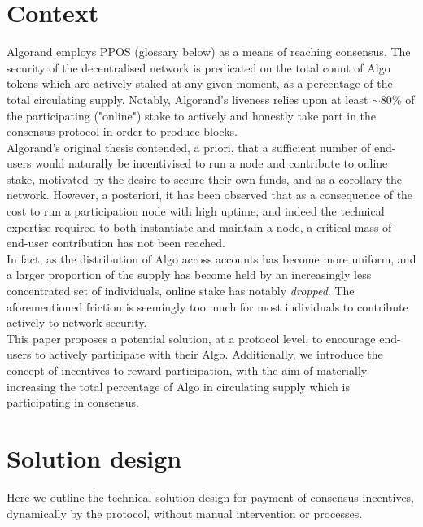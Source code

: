 \documentclass[11pt,a4paper]{article}
\begin{document}
\pagebreak

\section{Context}
Algorand employs \gls{PPOS} (glossary below) as a means of reaching consensus. The security of the decentralised network 
is predicated on the total count of Algo tokens which are actively staked at any given moment, as a percentage of the 
total circulating supply. Notably, Algorand's liveness relies upon at least $\sim$80\% of the participating ("online") 
stake to actively and honestly take part in the consensus protocol in order to produce blocks. \\ 

Algorand's original thesis contended, a priori, that a sufficient number of end-users would naturally be incentivised to 
run a node and contribute to online stake, motivated by the desire to secure their own funds, and as a corollary the 
network. However, a posteriori, it has been observed that as a consequence of the cost to run a participation node with 
high uptime, and indeed the technical expertise required to both instantiate and maintain a node, a critical mass of 
end-user contribution has not been reached. \\

In fact, as the distribution of Algo across accounts has become more uniform, and a larger proportion of the supply has 
become held by an increasingly less concentrated set of individuals, online stake has notably \emph{dropped}. The 
aforementioned friction is seemingly too much for most individuals to contribute actively to network security. \\

This paper proposes a potential solution, at a protocol level, to encourage end-users to actively participate with their 
Algo. Additionally, we introduce the concept of incentives to reward participation, with the aim of materially 
increasing the total percentage of Algo in circulating supply which is participating in consensus. 

\pagebreak

\section{Solution design}
Here we outline the technical solution design for payment of consensus incentives, dynamically by the protocol, without 
manual intervention or processes. 
\end{document}
